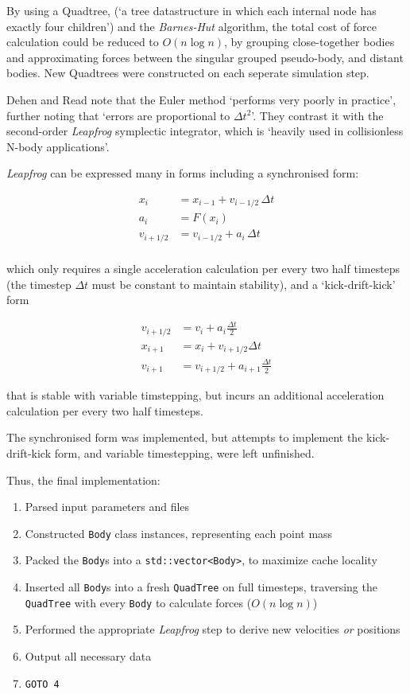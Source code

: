 \documentclass[11pt,a4paper]{article}
\begin{document}
By using a Quadtree, (`a tree datastructure in which each internal node has exactly four children') and the \textit{Barnes-Hut} algorithm\cite{barnes86a}, the total cost of force calculation could be reduced to $O(n \log n)$, by grouping close-together bodies and approximating forces between the singular grouped pseudo-body, and distant bodies. New Quadtrees were constructed on each seperate simulation step.

Dehen and Read note that the Euler method `performs very poorly in practice', further noting that `errors are proportional to $\Delta t^2$'. They contrast it with the second-order \textit{Leapfrog} symplectic integrator, which is `heavily used in collisionless N-body applications'.\cite{dehen11a}

\textit{Leapfrog} can be expressed many in forms\cite{Skeel1993} including a synchronised form:

\begin{align*}
x_{i}&=x_{i-1}+v_{i-1/2}\,\Delta t\\
a_{i}&=F(x_{i})\\
v_{i+1/2}&=v_{i-1/2}+a_{i}\,\Delta t\\
\end{align*}

which only requires a single acceleration calculation per every two half timesteps (the timestep $\Delta t$ must be constant to maintain stability), and a `kick-drift-kick' form

\begin{align*}
v_{i+1/2}&=v_{i}+a_{i}{\frac {\Delta t}{2}}\\
x_{i+1}&=x_{i}+v_{i+1/2}\Delta t\\
v_{i+1}&=v_{i+1/2}+a_{i+1}{\frac {\Delta t}{2}}
\end{align*}

that is stable with variable timstepping, but incurs an additional acceleration calculation per every two half timesteps.

The synchronised form was implemented, but attempts to implement the kick-drift-kick form, and variable timestepping, were left unfinished.

Thus, the final implementation:

\begin{enumerate}
    \item Parsed input parameters and files
    \item Constructed \texttt{Body} class instances, representing each point mass
    \item Packed the \texttt{Body}s into a \texttt{std::vector<Body>}, to maximize cache locality
    \item Inserted all \texttt{Body}s into a fresh \texttt{QuadTree} on full timesteps, traversing the \texttt{QuadTree} with every \texttt{Body} to calculate forces ($O(n \log n)$)
    \item Performed the appropriate \textit{Leapfrog} step to derive new velocities \textit{or} positions
    \item Output all necessary data
    \item \texttt{GOTO 4}
\end{enumerate}
\end{document}

